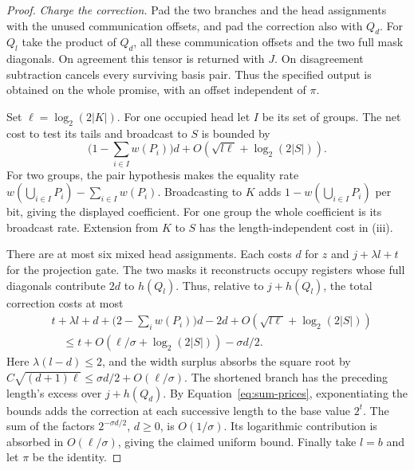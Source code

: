 \begin{proof}
\smallskip\noindent\emph{Charge the correction.}
Pad the two branches and the head assignments with the unused
communication offsets, and pad the correction also with \(Q_d\).
For \(Q_l\) take the product of \(Q_d\), all these communication
offsets and the two full mask diagonals. On agreement this tensor
is returned with \(J\). On disagreement subtraction cancels every
surviving basis pair. Thus the specified output is obtained on the
whole promise, with an offset independent of \(\pi\).

Set \(\ell=\log_2(2|K|)\). For one occupied head let \(I\) be its
set of groups. The net cost to test its tails and broadcast to \(S\)
is bounded by
\[
       \Big(1-\sum_{i\in I}w(P_i)\Big)d
          +O\!\left(\sqrt{l\ell}+\log_2(2|S|)\right).
\]
For two groups, the pair hypothesis makes the equality rate
\(w(\bigcup_{i\in I}P_i)-\sum_{i\in I}w(P_i)\). Broadcasting to \(K\)
adds \(1-w(\bigcup_{i\in I}P_i)\) per bit, giving the displayed
coefficient. For one group the whole coefficient is its broadcast
rate. Extension from \(K\) to \(S\) has the length-independent cost
in (iii).

There are at most six mixed head assignments. Each costs \(d\) for
\(z\) and \(j+\lambda l+t\) for the projection gate. The two masks
it reconstructs occupy registers whose full diagonals contribute
\(2d\) to \(h(Q_l)\). Thus, relative to \(j+h(Q_l)\), the total
correction costs at most
\begin{align*}
 & t+\lambda l+d+\Big(2-\sum_iw(P_i)\Big)d-2d
                   +O\!\left(\sqrt{l\ell}+\log_2(2|S|)\right)\\
 &\hspace{1em}\le
       t+O\!\left(\ell/\sigma+\log_2(2|S|)\right)-\sigma d/2 .
\end{align*}
Here \(\lambda(l-d)\le2\), and the width surplus absorbs the square
root by \(C\sqrt{(d+1)\ell}\le\sigma d/2+O(\ell/\sigma)\).
The shortened branch has the preceding length's excess over
\(j+h(Q_d)\). By Equation~\eqref{eq:sum-prices}, exponentiating the
bounds adds the correction at each successive length to the base value
\(2^t\). The sum of the factors \(2^{-\sigma d/2}\), \(d\ge0\), is
\(O(1/\sigma)\). Its logarithmic contribution is absorbed in
\(O(\ell/\sigma)\), giving the claimed uniform bound. Finally take
\(l=b\) and let \(\pi\) be the identity.
\end{proof}

